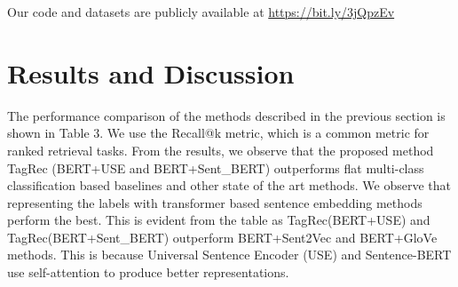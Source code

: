 \documentclass[runningheads, envcountsame, a4paper]{llncs}
\begin{document}
Our code and datasets are publicly available at  \url{https://bit.ly/3jQpzEv}



\section{Results and Discussion}
\setlength{\parindent}{0pt}


The performance comparison of the methods described in the previous section is shown in Table 3. We use the Recall@k metric, which is a common metric for ranked retrieval tasks. From the results, we observe that the proposed method TagRec (BERT+USE and BERT+Sent\_BERT) outperforms flat multi-class classification based baselines and other state of the art methods. We observe that representing the labels with transformer based sentence embedding methods perform the best. This is evident from the table as TagRec(BERT+USE) and TagRec(BERT+Sent\_BERT) outperform BERT+Sent2Vec and BERT+GloVe methods. This is because Universal Sentence Encoder (USE) and Sentence-BERT use self-attention to produce better representations. 
\end{document}
